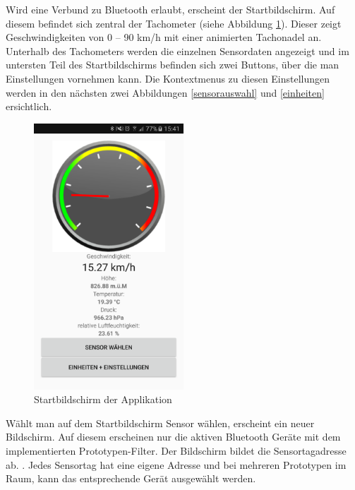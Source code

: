 Wird eine Verbund zu Bluetooth erlaubt, erscheint der Startbildschirm. Auf diesem befindet sich zentral der Tachometer (siehe Abbildung \ref{tacho}). Dieser zeigt Geschwindigkeiten von 0 – 90 km/h mit einer animierten Tachonadel an. Unterhalb des Tachometers werden die einzelnen Sensordaten angezeigt und im untersten Teil des Startbildschirms befinden sich zwei Buttons, über die man Einstellungen vornehmen kann. Die Kontextmenus zu diesen Einstellungen werden in den nächsten zwei Abbildungen \ref{sensorauswahl} und \ref{einheiten} ersichtlich. 

\begin{figure}[ht]
    \includegraphics[width=0.5\textwidth]{4Resultate/imag/APPHomeScreen.png} 
    \caption{Startbildschirm der Applikation}
    \label{tacho}
\end{figure}

Wählt man auf dem Startbildschirm \glqq Sensor wählen\grqq,  erscheint ein neuer Bildschirm. Auf diesem erscheinen nur die aktiven Bluetooth Geräte mit dem implementierten Prototypen-Filter. Der Bildschirm bildet die Sensortagadresse ab. . Jedes Sensortag hat eine eigene Adresse und bei mehreren Prototypen im Raum, kann das entsprechende Gerät ausgewählt werden.



